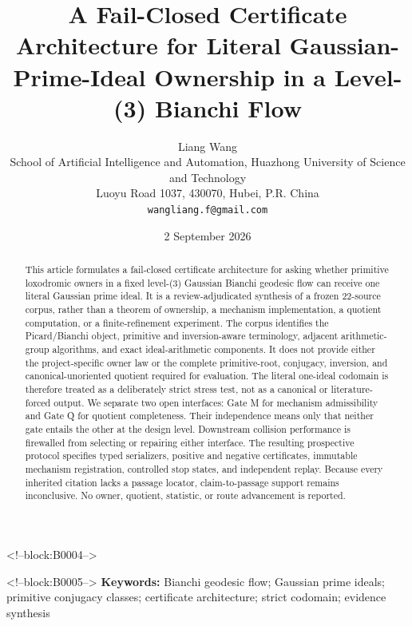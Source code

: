 \documentclass[11pt,a4paper]{article}
\title{A Fail-Closed Certificate Architecture for Literal Gaussian-Prime-Ideal Ownership in a Level-(3) Bianchi Flow}
\author{Liang Wang\\
\small School of Artificial Intelligence and Automation, Huazhong University of Science and Technology\\
\small Luoyu Road 1037, 430070, Hubei, P.R. China\\
\small \texttt{wangliang.f@gmail.com}}
\date{2 September 2026}
\begin{document}
\maketitle

<!--block:B0004-->
\begin{abstract}
This article formulates a fail-closed certificate architecture for asking whether primitive loxodromic owners in a fixed level-(3) Gaussian Bianchi geodesic flow can receive one literal Gaussian prime ideal. It is a review-adjudicated synthesis of a frozen 22-source corpus, rather than a theorem of ownership, a mechanism implementation, a quotient computation, or a finite-refinement experiment. The corpus identifies the Picard/Bianchi object, primitive and inversion-aware terminology, adjacent arithmetic-group algorithms, and exact ideal-arithmetic components. It does not provide either the project-specific owner law or the complete primitive-root, conjugacy, inversion, and canonical-unoriented quotient required for evaluation. The literal one-ideal codomain is therefore treated as a deliberately strict stress test, not as a canonical or literature-forced output. We separate two open interfaces: Gate M for mechanism admissibility and Gate Q for quotient completeness. Their independence means only that neither gate entails the other at the design level. Downstream collision performance is firewalled from selecting or repairing either interface. The resulting prospective protocol specifies typed serializers, positive and negative certificates, immutable mechanism registration, controlled stop states, and independent replay. Because every inherited citation lacks a passage locator, claim-to-passage support remains inconclusive. No owner, quotient, statistic, or route advancement is reported.
\end{abstract}

<!--block:B0005-->
\noindent\textbf{Keywords:} Bianchi geodesic flow; Gaussian prime ideals; primitive conjugacy classes; certificate architecture; strict codomain; evidence synthesis
\end{document}
